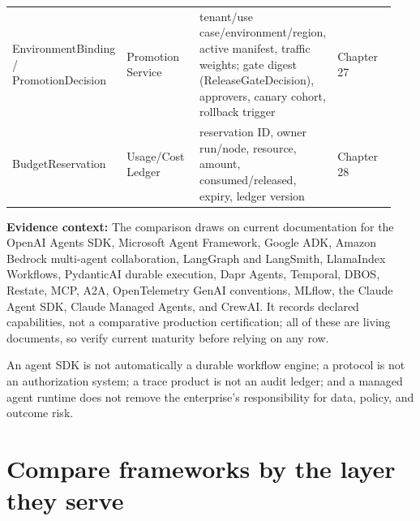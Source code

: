 \begin{longtable}{@{}Y{0.2350\linewidth}Y{0.2350\linewidth}Y{0.2350\linewidth}Y{0.2350\linewidth}@{}}
EnvironmentBinding / PromotionDecision & Promotion Service & tenant/use case/environment/region, active manifest, traffic weights; gate digest (ReleaseGateDecision), approvers, canary cohort, rollback trigger & Chapter 27 \\
BudgetReservation & Usage/Cost Ledger & reservation ID, owner run/node, resource, amount, consumed/released, expiry, ledger version & Chapter 28 \\
\end{longtable}
\BookTableEnd


\begin{bookquote}

\textbf{Evidence context:} The comparison draws on current documentation for the OpenAI Agents SDK, Microsoft Agent Framework, Google ADK, Amazon Bedrock multi-agent collaboration, LangGraph and LangSmith, LlamaIndex Workflows, PydanticAI durable execution, Dapr Agents, Temporal, DBOS, Restate, MCP, A2A, OpenTelemetry GenAI conventions, MLflow, the Claude Agent SDK, Claude Managed Agents, and CrewAI. It records declared capabilities, not a comparative production certification; all of these are living documents, so verify current maturity before relying on any row. \textbf{}

\end{bookquote}

\begin{bookcallout}
An agent SDK is not automatically a durable workflow engine; a protocol is not an authorization system; a trace product is not an audit ledger; and a managed agent runtime does not remove the enterprise’s responsibility for data, policy, and outcome risk.
\end{bookcallout}

\section{Compare frameworks by the layer they serve}

